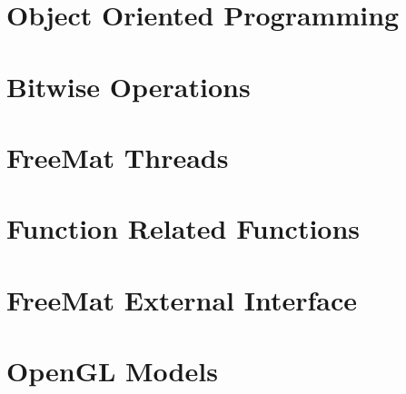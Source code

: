 \documentclass{book}
\begin{document}
\chapter{Object Oriented Programming}


































\chapter{Bitwise Operations}




\chapter{FreeMat Threads}








\chapter{Function Related Functions}


\chapter{FreeMat External Interface}












\chapter{OpenGL Models}





\end{document}
